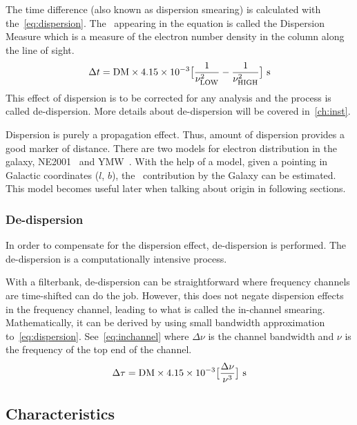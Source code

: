 \par The time difference (also known as dispersion smearing) is calculated with the~\autoref{eq:dispersion}. The \dm~appearing in the equation is called the Dispersion Measure which is a measure of the electron number density in the column along the line of sight.
\begin{equation}
\label{eq:dispersion}
\Delta t = {\rm DM} \times 4.15 \times 10^{-3} \big[  \frac{1}{\nu^2_{\rm LOW}} - \frac{1}{\nu^2_{\rm HIGH}} \big]\ {\rm s}
\end{equation}
This effect of dispersion is to be corrected for any analysis and the process is called de-dispersion. More details about de-dispersion will be covered in~\autoref{ch:inst}.

\par Dispersion is purely a propagation effect. Thus, amount of dispersion provides a good marker of distance. There are two models for electron distribution in the galaxy, NE2001~\cite{ne2001} and YMW~\cite{ymw16}. With the help of a model, given a pointing in Galactic coordinates ($l$, $b$), the \dm~contribution by the Galaxy can be estimated. This model becomes useful later when talking about \frb{} origin in following sections. 

\subsubsection {De-dispersion}
\label{sssub:dd}

\par In order to compensate for the dispersion effect, de-dispersion is performed. The de-dispersion is a computationally intensive process.
\par With a filterbank, de-dispersion can be straightforward where frequency channels are time-shifted can do the job. 
However, this does not negate dispersion effects in the frequency channel, leading to what is called the in-channel smearing.
Mathematically, it can be derived by using small bandwidth approximation to~\autoref{eq:dispersion}. 
See~\autoref{eq:inchannel} where $\Delta \nu$ is the channel bandwidth and $\nu$ is the frequency of the top end of the channel.
\begin{equation}
\label{eq:inchannel}
\Delta \tau = {\rm DM} \times 4.15 \times 10^{-3} \big[  \frac{\Delta \nu}{\nu^3}  \big]\ {\rm s}
\end{equation}

\subsection{Characteristics}
\label{ssub:frb}

